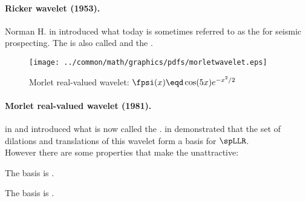 \paragraph{Ricker wavelet (1953).}
Norman H. \citeauthor{ricker1953} in \citeyear{ricker1953} introduced what today is sometimes referred to as the  for seismic prospecting.
The  is also called  and the .\footnotemark
{}

\begin{figure}[h]
  \gsize%
  \centering%
  \texttt{[image: ../common/math/graphics/pdfs/morletwavelet.eps]}
  \caption{Morlet real-valued wavelet: $\fpsi(x)\eqd \cos(5x) e^{-x^2/2}$ \label{fig:morletwavelet}}
\end{figure}
\paragraph{Morlet real-valued wavelet (1981).}
\citeauthor{morlet1981} in \citeyear{morlet1981} and \citeyear{morlet1983} introduced 
what is now called the .
 in \citeyear{grossman1984}
demonstrated that the  set of dilations and translations of this wavelet form a  basis for $\spLLR$.\footnotemark
{}\\
However there are some properties that make the  unattractive:
\begin{liste}
  \item The basis is .
  \item The basis is .
\end{liste}

